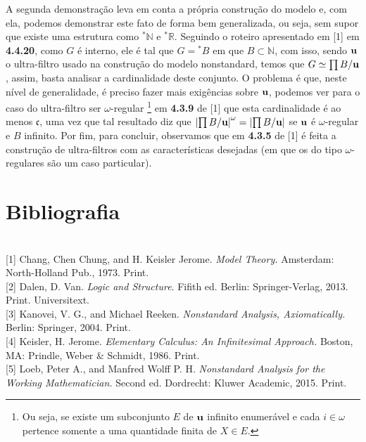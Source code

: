 \documentclass[11pt,a4paper]{article}
\theoremstyle{definition}
\begin{document}
A segunda demonstração leva em conta a própria construção do modelo e, com ela, podemos demonstrar este fato de forma bem generalizada, ou seja, sem supor que existe uma estrutura como $^*\mathbb{N}$ e $^*\mathbb{R}$. Seguindo o roteiro apresentado em [1] em \textbf{4.4.20}, como $G$ é interno, ele é tal que $G={^* B}$ em que $B\subset\mathbb{N}$, com isso, sendo $\bf{u}$ o ultra-filtro usado na construção do modelo nonstandard, temos que $G \simeq \prod B/\bf{u}$, assim, basta analisar a cardinalidade deste conjunto. O problema é que, neste nível de generalidade, é preciso fazer mais exigências sobre $\bf{u}$, podemos ver para o caso do ultra-filtro ser $\omega$-regular \footnote{Ou seja, se existe um subconjunto $E$ de $\bf{u}$ infinito enumerável e cada $i\in \omega$ pertence somente a uma quantidade finita de $X\in E$.} em \textbf{4.3.9} de [1] que esta cardinalidade é ao menos $\mathfrak{c}$, uma vez que tal resultado diz que $ \left|\prod B/\bf{u}\right|^\omega = \left|\prod B/\bf{u}\right|$ se  $\bf{u}$ é $\omega$-regular e $B$ infinito. Por fim, para concluir, observamos que em \textbf{4.3.5} de [1] é feita a construção de ultra-filtros com as características desejadas (em que os do tipo $\omega$-regulares são um caso particular). 

\section{Bibliografia}

\ \\


[1] Chang, Chen Chung, and H. Keisler Jerome. \textit{Model Theory.} Amsterdam: North-Holland Pub., 1973. Print. \\

[2] Dalen, D. Van.\textit{ Logic and Structure}. Fifith ed. Berlin: Springer-Verlag, 2013. Print. Universitext. \\

[3] Kanovei, V. G., and Michael Reeken. \textit{Nonstandard Analysis, Axiomatically.} Berlin: Springer, 2004. Print. \\

[4] Keisler, H. Jerome. \textit{Elementary Calculus: An Infinitesimal Approach.} Boston, MA: Prindle, Weber \& Schmidt, 1986. Print. \\

[5] Loeb, Peter A., and Manfred Wolff P. H. \textit{Nonstandard Analysis for the Working Mathematician.} Second ed. Dordrecht: Kluwer Academic, 2015. Print. \\
\end{document}
